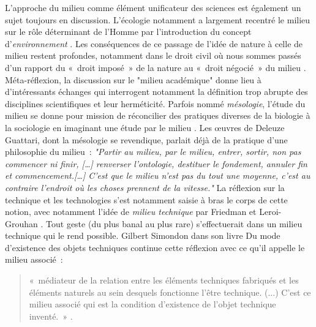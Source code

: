 L’approche du milieu comme élément unificateur des sciences est également un sujet toujours en discussion. L’écologie notamment a largement recentré le milieu sur le rôle déterminant de l’Homme par l’introduction du concept d’\textit{environnement} \citep{Gandolfo2008}. Les conséquences de ce passage de l’idée de nature à celle de milieu restent profondes, notamment dans le droit civil où nous sommes passés d’un rapport du « droit imposé » de la nature au « droit négocié » du milieu \citep{Papaux2008}. Méta-réflexion, la discussion sur le "milieu académique" donne lieu à d’intéressants échanges \citep{Stengers2009} qui interrogent notamment la définition trop abrupte des disciplines scientifiques et leur herméticité. Parfois nommé \textit{mésologie}, l’étude du milieu se donne pour mission de réconcilier des pratiques diverses de la biologie à la sociologie en imaginant une étude par le milieu \citep{Stengers2003}. Les œuvres de Deleuze  Guattari, dont la mésologie se revendique, parlait déjà de la pratique d’une philosophie du milieu : \textit{"Partir au milieu, par le milieu, entrer, sortir, non pas commencer ni ﬁnir, […] renverser l'ontologie, destituer le fondement, annuler ﬁn et commencement.[…] C'est que le milieu n'est pas du tout une moyenne, c'est au contraire l'endroit où les choses prennent de la vitesse."} \citep{Deleuze1972} 
La réflexion sur la technique et les technologies s’est notamment saisie à bras le corps de cette notion, avec notamment l’idée de \textit{milieu technique} par Friedman et Leroi-Grouhan \citep{Stiegler1998}. Tout geste (du plus banal au plus rare) s’effectuerait dans un milieu technique qui le rend possible. Gilbert Simondon dans son livre Du mode d’existence des objets techniques continue cette réflexion avec ce qu’il appelle le milieu associé : 
\begin{quote}
« médiateur de la relation entre les éléments techniques fabriqués et les éléments 	naturels au sein desquels fonctionne l’être technique. (...) C’est ce milieu associé 	qui est la condition d’existence de l’objet technique inventé. » \citep{Simondon1989}. 
\end{quote}
